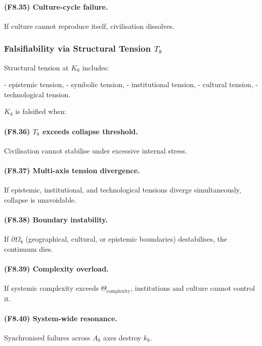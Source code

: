 \paragraph{(F8.35) Culture-cycle failure.}
If culture cannot reproduce itself,
civilisation dissolves.



\subsubsection{Falsifiability via Structural Tension \texorpdfstring{$T_8$}{T_8}}

Structural tension at $K_8$ includes:

- epistemic tension,
- symbolic tension,
- institutional tension,
- cultural tension,
- technological tension.

$K_8$ is falsified when:

\paragraph{(F8.36) \texorpdfstring{$T_8$}{T_8} exceeds collapse threshold.}
Civilisation cannot stabilise under excessive internal stress.

\paragraph{(F8.37) Multi-axis tension divergence.}
If epistemic, institutional, and technological tensions diverge simultaneously,
collapse is unavoidable.

\paragraph{(F8.38) Boundary instability.}
If $\partial\Omega_8$ (geographical, cultural, or epistemic boundaries)
destabilises, the continuum dies.

\paragraph{(F8.39) Complexity overload.}
If systemic complexity exceeds $\Theta_{\mathrm{complexity}}$,
institutions and culture cannot control it.

\paragraph{(F8.40) System-wide resonance.}
Synchronised failures across $A_8$ axes destroy $k_8$.



